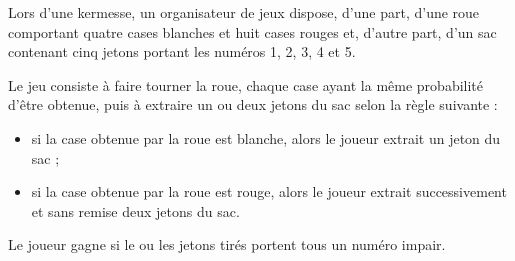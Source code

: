 Lors d'une kermesse, un organisateur de jeux dispose, d'une part, d'une roue comportant quatre cases blanches et huit cases rouges et, d'autre part, d'un sac contenant cinq jetons portant les numéros 1, 2, 3, 4 et 5.

Le jeu consiste à faire tourner la roue, chaque case ayant la même probabilité d'être obtenue, puis à extraire un ou deux jetons du sac selon la règle suivante :

\begin{itemize}
	\item si la case obtenue par la roue est blanche, alors le joueur extrait un jeton du sac ;
	\item si la case obtenue par la roue est rouge, alors le joueur extrait successivement et sans remise deux jetons du sac.
\end{itemize}

Le joueur gagne si le ou les jetons tirés portent tous un numéro impair.

